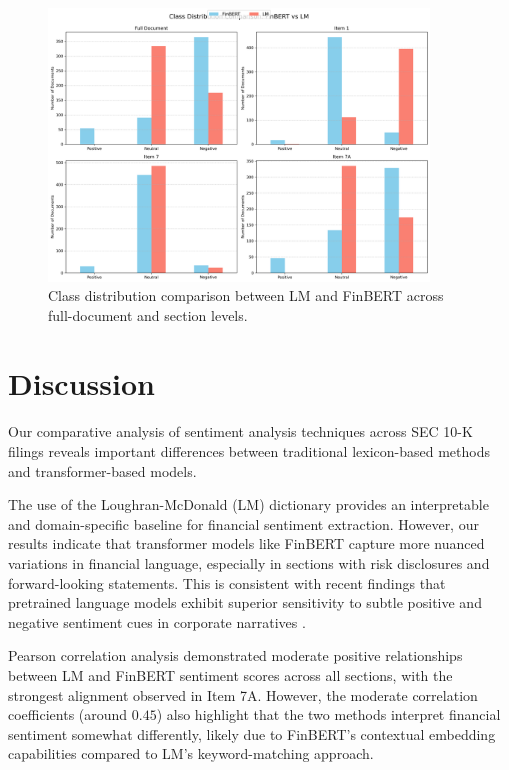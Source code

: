 \documentclass[12pt]{article}
\begin{document}
\begin{figure}[H]
\centering
\includegraphics[width=0.9\textwidth]{figures/class_distribution_all_sections.png}
\caption{Class distribution comparison between LM and FinBERT across full-document and section levels.}
\label{fig:class_dist_all}
\end{figure}
\vspace{0.5cm}

\section{Discussion}

Our comparative analysis of sentiment analysis techniques across SEC 10-K filings reveals important differences between traditional lexicon-based methods and transformer-based models.

The use of the Loughran-McDonald (LM) dictionary \citep{Loughran2011} provides an interpretable and domain-specific baseline for financial sentiment extraction. However, our results indicate that transformer models like FinBERT \citep{Araci2019} capture more nuanced variations in financial language, especially in sections with risk disclosures and forward-looking statements. This is consistent with recent findings that pretrained language models exhibit superior sensitivity to subtle positive and negative sentiment cues in corporate narratives \citep{Huang2020}.

Pearson correlation analysis demonstrated moderate positive relationships between LM and FinBERT sentiment scores across all sections, with the strongest alignment observed in Item 7A. However, the moderate correlation coefficients (around $0.45$) also highlight that the two methods interpret financial sentiment somewhat differently, likely due to FinBERT’s contextual embedding capabilities compared to LM’s keyword-matching approach.
\end{document}
